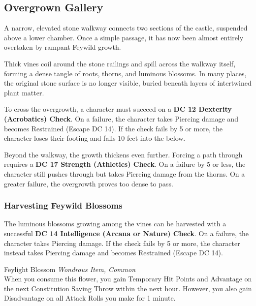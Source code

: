 \subsection*{ Overgrown Gallery}
{\entryfont A narrow, elevated stone walkway connects two sections of the castle, suspended above a lower chamber. Once a simple passage, it has now been almost entirely overtaken by rampant Feywild growth.

Thick vines coil around the stone railings and spill across the walkway itself, forming a dense tangle of roots, thorns, and luminous blossoms. In many places, the original stone surface is no longer visible, buried beneath layers of intertwined plant matter.

To cross the overgrowth, a character must succeed on a \textbf{DC 12 Dexterity (Acrobatics) Check}. On a failure, the character takes  Piercing damage and becomes Restrained (Escape DC 14). If the check fails by 5 or more, the character loses their footing and falls 10 feet into the \hyperref[sec:OvergrownLaboratory]{} below.

Beyond the walkway, the growth thickens even further. Forcing a path through requires a \textbf{DC 17 Strength (Athletics) Check}. On a failure by 5 or less, the character still pushes through but takes  Piercing damage from the thorns. On a greater failure, the overgrowth proves too dense to pass.}
\subsubsection*{Harvesting Feywild Blossoms}
{\entryfont The luminous blossoms growing among the vines can be harvested with a successful \textbf{DC 14 Intelligence (Arcana or Nature) Check}. On a failure, the character takes  Piercing damage. If the check fails by 5 or more, the character instead takes  Piercing damage and becomes Restrained (Escape DC 14).}
\begingroup
	\DndSetThemeColor[PhbLightGreen]
	\begin{DndComment}{Feylight Blossom\label{mi:FeylightBlossom}}
		\textit{Wondrous Item, Common}\\
		When you consume this flower, you gain  Temporary Hit Points and Advantage on the next Constitution Saving Throw within the next hour. However, you also gain Disadvantage on all Attack Rolls you make for 1 minute.
	\end{DndComment}
\endgroup

